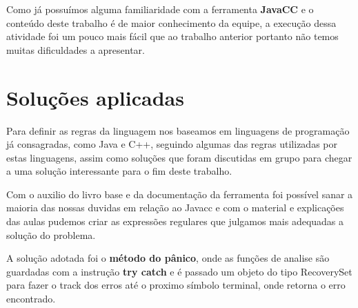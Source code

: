 \documentclass[
	article,			%
	11pt,				%
	oneside,			%
	a4paper,			%
	portuguese,			%
	brazil,				%
	sumario=tradicional
	]{abntex2}
\begin{document}
Como já possuímos alguma familiaridade com a ferramenta \textbf{JavaCC} e o conteúdo deste trabalho é de maior conhecimento da equipe, a execução dessa atividade foi um pouco mais fácil que ao trabalho anterior portanto não temos muitas dificuldades a apresentar.

\section{Soluções aplicadas}

Para definir as regras da linguagem nos baseamos em linguagens de programação já consagradas, como Java e C++, seguindo algumas das regras utilizadas por estas
linguagens, assim como soluções que foram discutidas em grupo para chegar a uma solução interessante para o fim deste trabalho.

Com o auxilio do livro base e da documentação da ferramenta foi possível  sanar a maioria das nossas duvidas em relação ao Javacc e com o material e explicações das aulas
pudemos criar as expressões regulares que julgamos mais adequadas a solução do problema.

A solução adotada foi o \textbf{método do pânico}, onde as funções de analise são guardadas com a instrução \textbf{try catch} e é passado um objeto do tipo RecoverySet para fazer o track dos erros até o proximo símbolo terminal, onde retorna o erro encontrado.
\end{document}
